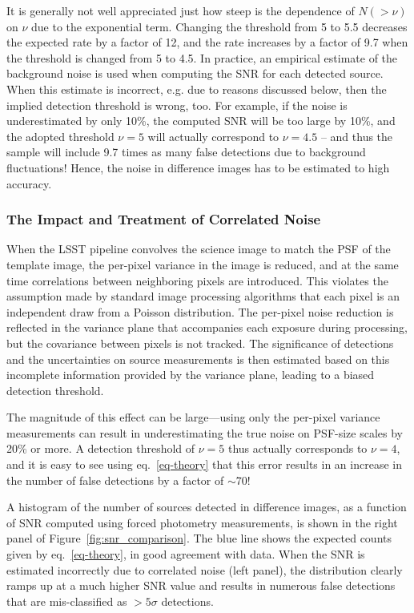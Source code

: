 It is generally not well appreciated just how steep is the dependence of $N(>\nu)$
on $\nu$ due to the exponential term. Changing the threshold from 5 to 5.5
decreases the expected rate by a factor of 12, and the rate increases by a factor
of 9.7 when the threshold is changed from 5 to 4.5. In practice, an empirical estimate
of the background noise is used when computing the SNR for each detected source.
When this estimate is incorrect, e.g. due to reasons discussed below, then the
implied detection threshold is wrong, too. For example, if the noise is underestimated
by only 10\%, the computed SNR will be too large by 10\%, and the adopted
threshold $\nu=5$ will actually correspond to $\nu=4.5$ -- and thus the
sample will include 9.7 times as many false detections due to background
fluctuations! Hence, the noise in difference images has to be estimated to
high accuracy.


\subsubsection{The Impact and Treatment of Correlated Noise}

When the LSST pipeline convolves the science image to match the PSF of the template
image, the per-pixel variance in the image is reduced, and at the same
time correlations between neighboring pixels are introduced. This violates the
assumption made by standard image processing algorithms that each pixel is an
independent draw from a Poisson distribution. The per-pixel noise reduction is
reflected in the variance plane that accompanies each exposure during
processing, but the covariance between pixels is not tracked.
The significance of detections and the uncertainties on source measurements is
then estimated based on this incomplete information provided by the variance
plane, leading to a biased detection threshold.

The magnitude of this effect can be large---using only the per-pixel variance
measurements can result in underestimating the true noise on PSF-size scales by
20\% or more. A detection threshold of $\nu=5$ thus actually corresponds to
$\nu=4$, and it is easy to see using eq.~\ref{eq-theory} that this error results
in an increase in the number of false detections by a factor of $\sim$70!

A histogram of the number of sources detected in difference images, as a function
of SNR computed using forced photometry measurements, is shown in the right panel
of Figure~\ref{fig:snr_comparison}. The blue line shows the expected counts given
by eq.~\ref{eq-theory}, in good agreement with data. When the SNR is estimated
incorrectly due to correlated noise (left panel), the distribution clearly ramps
up at a much higher SNR value and results in numerous false detections that are
mis-classified as $>5 \sigma$ detections.

